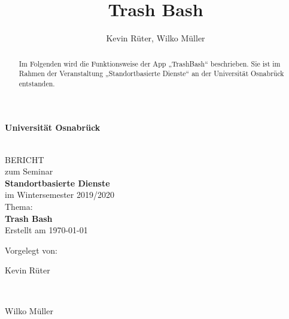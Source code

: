 \documentclass[a4paper, 11pt, DIV=11, listof=numbered, numbers=noenddot]{scrartcl}
\title{Trash Bash}
\author{Kevin Rüter, Wilko Müller}
\begin{document}
	
	
	\begin{titlepage}
		\begin{center}
			\vspace*{1.5cm}
			\begin{Large}
				\textbf{Universit\"at Osnabr\"uck}
			\end{Large}
			
			\noindent\hrulefill
			\\[3.5cm]
			BERICHT \\[1cm]
			zum Seminar \\[1cm]
			\textbf{Standortbasierte Dienste} \\[1.5cm]    %
			im Wintersemester 2019/2020 \\[1.5cm]   %
			Thema: \\[0.5cm]
			\textbf{Trash Bash} \\[2cm]        %
			Erstellt am \today
		\end{center}
		\vfill
		\begin{flushleft}
			Vorgelegt von: 
			\hfill \parbox{60mm}{Kevin Rüter} \\  %
			\hfill \parbox{60mm}{Wilko Müller}
		\end{flushleft}
	\end{titlepage}
	
	
	\newpage
	\tableofcontents 
	
	
	
	\newpage
	
	\maketitle
	
	\begin{abstract}
		\noindent Im Folgenden wird die Funktionsweise der App „TrashBash“ beschrieben. 
			Sie ist im Rahmen der Veranstaltung „Standortbasierte Dienste“ an der Universität Osnabrück entstanden.
	\end{abstract}
	
\end{document}

